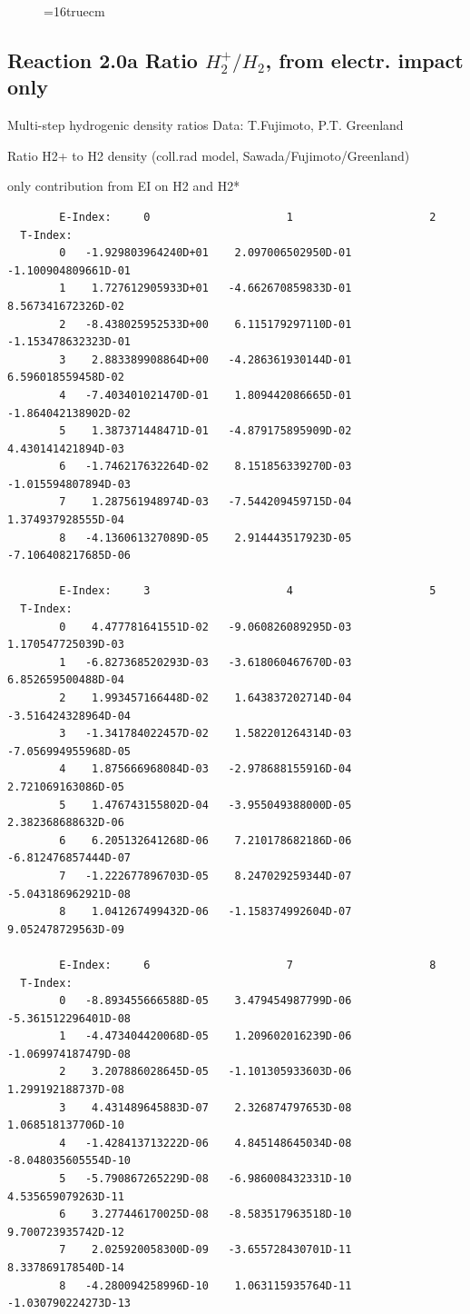 \documentclass[12pt,dvips]{article}
\begin{document}
\begin{figure} \label{7.2e}
\epsfxsize=16truecm
\end{figure}
\newpage

\subsection{
Reaction 2.0a Ratio $H_2^+/H_2$, from electr. impact only
}

 Multi-step hydrogenic density ratios
 Data: T.Fujimoto, P.T. Greenland


  Ratio H2+ to H2 density
  (coll.rad model, Sawada/Fujimoto/Greenland)

  only contribution from  EI on H2 and H2*


\begin{small}\begin{verbatim}
        E-Index:     0                     1                     2
  T-Index:
        0   -1.929803964240D+01    2.097006502950D-01   -1.100904809661D-01
        1    1.727612905933D+01   -4.662670859833D-01    8.567341672326D-02
        2   -8.438025952533D+00    6.115179297110D-01   -1.153478632323D-01
        3    2.883389908864D+00   -4.286361930144D-01    6.596018559458D-02
        4   -7.403401021470D-01    1.809442086665D-01   -1.864042138902D-02
        5    1.387371448471D-01   -4.879175895909D-02    4.430141421894D-03
        6   -1.746217632264D-02    8.151856339270D-03   -1.015594807894D-03
        7    1.287561948974D-03   -7.544209459715D-04    1.374937928555D-04
        8   -4.136061327089D-05    2.914443517923D-05   -7.106408217685D-06

        E-Index:     3                     4                     5
  T-Index:
        0    4.477781641551D-02   -9.060826089295D-03    1.170547725039D-03
        1   -6.827368520293D-03   -3.618060467670D-03    6.852659500488D-04
        2    1.993457166448D-02    1.643837202714D-04   -3.516424328964D-04
        3   -1.341784022457D-02    1.582201264314D-03   -7.056994955968D-05
        4    1.875666968084D-03   -2.978688155916D-04    2.721069163086D-05
        5    1.476743155802D-04   -3.955049388000D-05    2.382368688632D-06
        6    6.205132641268D-06    7.210178682186D-06   -6.812476857444D-07
        7   -1.222677896703D-05    8.247029259344D-07   -5.043186962921D-08
        8    1.041267499432D-06   -1.158374992604D-07    9.052478729563D-09

        E-Index:     6                     7                     8
  T-Index:
        0   -8.893455666588D-05    3.479454987799D-06   -5.361512296401D-08
        1   -4.473404420068D-05    1.209602016239D-06   -1.069974187479D-08
        2    3.207886028645D-05   -1.101305933603D-06    1.299192188737D-08
        3    4.431489645883D-07    2.326874797653D-08    1.068518137706D-10
        4   -1.428413713222D-06    4.845148645034D-08   -8.048035605554D-10
        5   -5.790867265229D-08   -6.986008432331D-10    4.535659079263D-11
        6    3.277446170025D-08   -8.583517963518D-10    9.700723935742D-12
        7    2.025920058300D-09   -3.655728430701D-11    8.337869178540D-14
        8   -4.280094258996D-10    1.063115935764D-11   -1.030790224273D-13


\end{verbatim}
\end{small}
\end{document}
